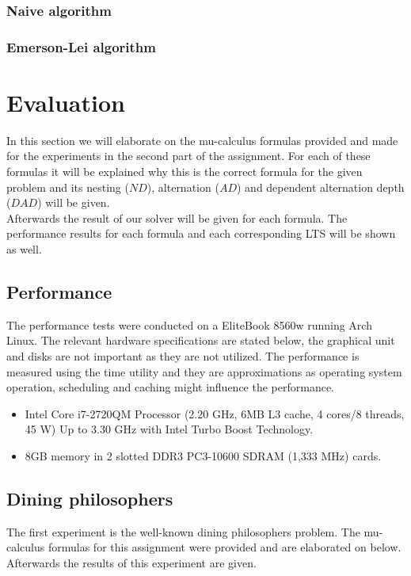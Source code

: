 \documentclass[10pt,a4paper]{article}
\begin{document}
\subsubsection{Naive algorithm}


\subsubsection{Emerson-Lei algorithm}

\section{Evaluation}\label{eval}
In this section we will elaborate on the mu-calculus formulas provided and made for the experiments in the second part of the assignment. For each of these formulas it will be explained why this is the correct formula for the given problem and its nesting ($ND$), alternation ($AD$) and dependent alternation depth ($DAD$) will be given.\\
Afterwards the result of our solver will be given for each formula. The performance results for each formula and each corresponding LTS will be shown as well.

\subsection{Performance}

The performance tests were conducted on a EliteBook 8560w running Arch Linux. The relevant hardware specifications are stated below, the graphical unit and disks are not important as they are not utilized. The performance is measured using the time utility and they are approximations as operating system operation, scheduling and caching might influence the performance.

\begin{itemize}
	\item Intel Core i7-2720QM Processor (2.20 GHz, 6MB L3 cache, 4 cores/8 threads, 45 W) Up to 3.30 GHz with Intel Turbo Boost Technology.
	
	\item 8GB memory in 2 slotted DDR3 PC3-10600 SDRAM (1,333 MHz) cards.
\end{itemize}

\subsection{Dining philosophers}
The first experiment is the well-known dining philosophers problem. The mu-calculus formulas for this assignment were provided and are elaborated on below. Afterwards the results of this experiment are given.
\end{document}
